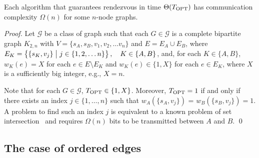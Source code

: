 \documentclass{llncs}
\newcommand{\Topts}{T_{\scriptsize \textup{OPT}}}
\newcommand{\startpos}[1]{s_{#1}}
\newcommand{\starta}{\startpos{A}}
\newcommand{\startb}{\startpos{B}}
\newcommand{\cG}{\mathcal{G}}
\newcommand{\agentVariable}{K}
\newcommand{\st}{\hspace{0.1cm}\bigl|\bigr.\hspace{0.1cm}}
\begin{document}
\begin{theorem} \label{thm:arbitrary+comm+lower}
Each algorithm that guarantees rendezvous in time $\Theta(\Topts)$ has communication complexity $\Omega(n)$ for some $n$-node graphs.
\end{theorem}

\begin{proof}
Let $\cG$ be a class of graph such that each $G\in\cG$ is a complete bipartite graph  $K_{2, n}$
with $V = \{\starta, \startb, v_1, v_2, \ldots v_n\}$
and $E=E_A\cup E_B$, where
$E_{\agentVariable} = \left\{ \{\startpos{{\agentVariable}}, v_j\} \st j \in \{1, 2, \ldots n \} \right\},\quad {\agentVariable}\in\{A,B\}$,
and, for each ${\agentVariable}\in\{A,B\}$, $w_{\agentVariable}(e)=X$ for each $e\in E\setminus E_{\agentVariable}$ and $w_{\agentVariable}(e) \in \{1, X\}$ for each $e\in E_{\agentVariable}$,
where $X$ is a sufficiently big integer, e.g., $X=n$.

Note that for each $G\in\cG$, $\Topts\in\{1,X\}$.
Moreover, $\Topts=1$ if and only if there exists an index $j\in\{1,\ldots,n\}$ such that $w_A(\{\starta, v_j\})$ = $w_B(\{\startb, v_j\}) = 1$.
A problem to find such an index $j$ is equivalent to a known problem of set intersection~\cite{Kalyanasundaram:1992:PCC:140820.140844}
and requires $\Omega(n)$ bits to be transmitted between $A$ and $B$.
\qed\end{proof}


\subsection{The case of ordered edges}
\end{document}
